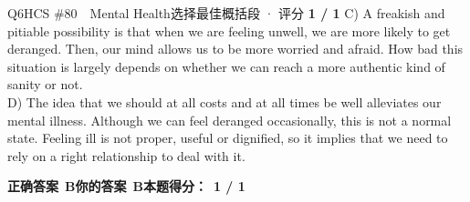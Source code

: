 \documentclass[11pt]{article}
\begin{document}
\begin{qblock}{Q6\quad HCS \#80\ \ Mental Health}{选择最佳概括段 · 评分 \textcolor{cAccent}{\bfseries 1 / 1}}
{C) A freakish and pitiable possibility is that when we are feeling unwell, we are more likely to get deranged. Then, our mind allows us to be more worried and afraid. How bad this situation is largely depends on whether we can reach a more authentic kind of sanity or not.\\
D) The idea that we should at all costs and at all times be well alleviates our mental illness. Although we can feel deranged occasionally, this is not a normal state. Feeling ill is not proper, useful or dignified, so it implies that we need to rely on a right relationship to deal with it.}
\par\smallskip
\textbf{正确答案}\ \textcolor{cFix}{\bfseries B}\qquad\textbf{你的答案}\ \textcolor{cFix}{\bfseries B}\qquad\textbf{本题得分：}\ {\color{cAccent}\bfseries 1 / 1}
\end{qblock}
\end{document}
